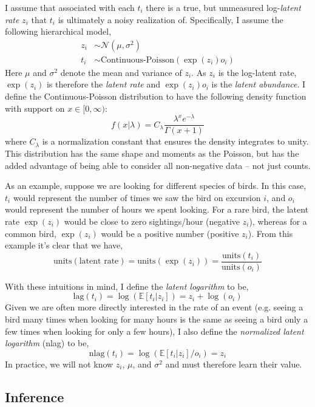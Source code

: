 \documentclass[11pt]{article}
\begin{document}
I assume that associated with each $t_i$ there is a true, but unmeasured log-\emph{latent rate} $z_i$ that $t_i$ is ultimately a noisy realization of. Specifically, I assume the following hierarchical model,
\begin{align*}
z_i &\sim \mathcal{N}\left(\mu, \sigma^2\right) \\
t_i & \sim \textrm{Continuous-Poisson}(\exp(z_i)o_i)
\end{align*}
Here $\mu$ and $\sigma^2$ denote the mean and variance of $z_i$. As $z_i$ is the log-latent rate, $\exp(z_i)$ is therefore the \emph{latent rate} and $\exp(z_i)o_i$ is the \emph{latent abundance}. I define the Continuous-Poisson distribution to have the following density function with support on $x \in [0, \infty)$: 
\[
f(x|\lambda) = C_{\lambda}\frac{ \lambda^x e^{-\lambda}}{\Gamma(x + 1)}
\]
where $C_\lambda$ is a normalization constant that ensures the density integrates to unity. This distribution has the same shape and moments as the Poisson, but has the added advantage of being able to consider all non-negative data -- not just counts.

As an example, suppose we are looking for different species of birds. In this case, $t_i$ would represent the number of times we saw the bird on excursion $i$, and $o_i$ would represent the number of hours we spent looking. For a rare bird, the latent rate $\exp(z_i)$ would be close to zero sightings/hour (negative $z_i$), whereas for a common bird, $\exp(z_i)$ would be a positive number (positive $z_i$). From this example it's clear that we have,
\[
\textrm{units}(\textrm{latent rate}) = \textrm{units}(\exp(z_i)) = \frac{ \textrm{units}(t_i)}{ \textrm{units}(o_i)}
\]

With these intuitions in mind, I define the \emph{latent logarithm} to be,
\[
\textrm{lag}(t_i) = \log(\mathbb{E}[t_i|z_i]) = z_i + \log(o_i)
\]
Given we are often more directly interested in the rate of an event (e.g. seeing a bird many times when looking for many hours is the same as seeing a bird only a few times when looking for only a few hours), I also define the \emph{normalized latent logarithm} (nlag) to be, 
\[
\textrm{nlag}(t_i) = \log(\mathbb{E}[t_i|z_i]/o_i) = z_i
\]
In practice, we will not know $z_i$, $\mu$, and $\sigma^2$ and must therefore learn their value.

\subsection{Inference}
\end{document}

